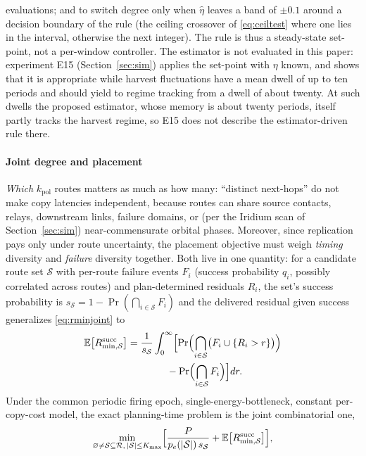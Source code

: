 \documentclass[twocolumn,3p,times,procedia]{elsarticle}
\theoremstyle{plain}
\theoremstyle{remark}
\newcommand{\E}{\mathbb{E}}
\newcommand{\peff}{p_e}
\begin{document}
evaluations; and to switch degree only when $\hat\eta$ leaves a band of
$\pm0.1$ around a decision boundary of the rule (the ceiling crossover
of \eqref{eq:ceiltest} where one lies in the interval, otherwise the
next integer). The rule is thus a steady-state set-point, not a
per-window controller. The estimator is not evaluated in this paper:
experiment E15 (Section~\ref{sec:sim}) applies the set-point with $\eta$
known, and shows that it is appropriate while harvest fluctuations have
a mean dwell of up to ten periods and should yield to regime tracking
from a dwell of about twenty. At such dwells the proposed estimator,
whose memory is about twenty periods, itself partly tracks the harvest
regime, so E15 does not describe the estimator-driven rule there.

\paragraph*{Joint degree and placement}
\emph{Which} $k_{\mathrm{pol}}$ routes matters as much as how many:
``distinct next-hops'' do not make copy latencies independent, because
routes can share source contacts, relays, downstream links, failure domains,
or (per the Iridium scan of Section~\ref{sec:sim}) near-commensurate
orbital phases. Moreover, since replication pays only under route
uncertainty, the placement objective must weigh \emph{timing}
diversity and \emph{failure} diversity together. Both live in one
quantity: for a candidate route set $\mathcal{S}$ with per-route
failure events
$F_i$ (success probability $q_i$, possibly correlated across
routes) and plan-determined residuals $R_i$, the set's success
probability is $s_{\mathcal{S}}=1-\Pr(\bigcap_{i\in\mathcal{S}}F_i)$
and the delivered
residual given success generalizes \eqref{eq:rminjoint} to
\begin{equation}\label{eq:rminsucc}
\begin{aligned}
\E\bigl[R^{\mathrm{succ}}_{\min,\mathcal{S}}\bigr]
&=\frac{1}{s_{\mathcal{S}}}\int_0^\infty\Bigl[\Pr\Bigl(\bigcap_{i\in\mathcal{S}}
\bigl(F_i\cup\{R_i>r\}\bigr)\Bigr)\\
&\qquad\qquad-\Pr\Bigl(\bigcap_{i\in\mathcal{S}}F_i\Bigr)\Bigr]dr.
\end{aligned}
\end{equation}
Under the common periodic firing epoch, single-energy-bottleneck,
constant per-copy-cost model, the exact planning-time problem is the
joint combinatorial one,
\begin{equation}\label{eq:jointopt}
\min_{\varnothing\ne\mathcal{S}\subseteq\mathcal{R},\,
|\mathcal{S}|\le K_{\max}}
\Bigl[\frac{P}{\peff(|\mathcal{S}|)\,s_{\mathcal{S}}}
+\E\bigl[R^{\mathrm{succ}}_{\min,\mathcal{S}}\bigr]\Bigr],
\end{equation}
\end{document}
